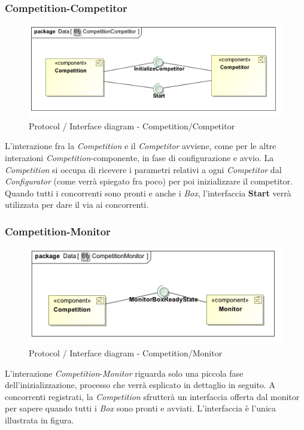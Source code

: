 \subsubsection{Competition-Competitor}
\begin{center}
\begin{figure}[h!]
	\includegraphics[scale=0.55]{img/InteractionDiagram/Implementation_Diagram__CompetitionCompetitor.jpg}
\caption{Protocol / Interface diagram - Competition/Competitor}
\end{figure}
\end{center}
L'interazione fra la \emph{Competition} e il \emph{Competitor} avviene, come per le altre interazioni \emph{Competition}-componente, in fase di configurazione
e avvio. La \emph{Competition} si occupa di ricevere i parametri relativi a ogni \emph{Competitor} dal \emph{Configurator} (come verr\`{a} spiegato fra poco) per 
poi inizializzare il competitor. Quando tutti i concorrenti sono pronti e anche i \emph{Box}, l'interfaccia \textbf{Start} verr\`{a} utilizzata per dare il
via ai concorrenti.
\subsubsection{Competition-Monitor}
\begin{center}
\begin{figure}[h!]
	\includegraphics[scale=0.55]{img/InteractionDiagram/Implementation_Diagram__CompetitionMonitor.jpg}
\caption{Protocol / Interface diagram - Competition/Monitor}
\end{figure}
\end{center}
L'interazione \emph{Competition}-\emph{Monitor} riguarda solo una piccola fase dell'inizializzazione, processo che verr\`{a} esplicato in dettaglio in seguito.
A concorrenti registrati, la \emph{Competition} sfrutter\`{a} un interfaccia offerta dal monitor per sapere quando tutti i \emph{Box} sono pronti e avviati.
L'interfaccia \`{e} l'unica illustrata in figura.
\clearpage
